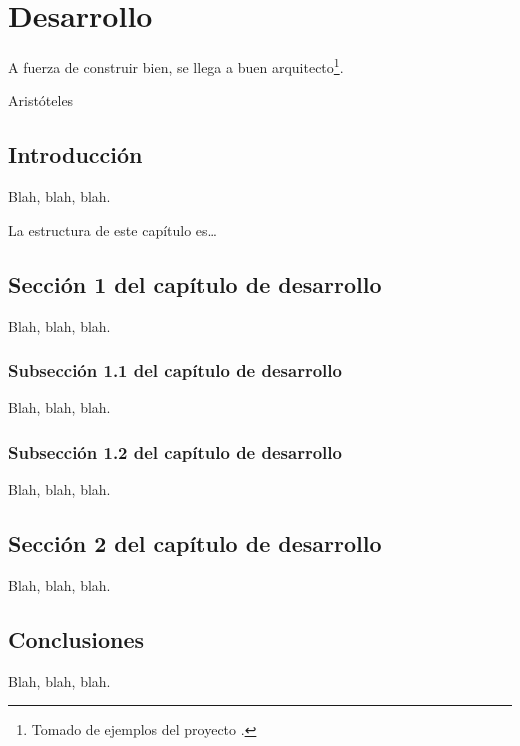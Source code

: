 %

\chapter{Desarrollo}
\label{cha:development}


\begin{FraseCelebre}
  \begin{Frase}
    A fuerza de construir bien, se llega a buen
    arquitecto\footnote{Tomado de ejemplos del proyecto \texis{}.}.
  \end{Frase}
  \begin{Fuente}
    Aristóteles
  \end{Fuente}
\end{FraseCelebre}



\section{Introducción}
\label{sec:development-introduction}

Blah, blah, blah.

La estructura de este capítulo es\ldots


\section{Sección 1 del capítulo de desarrollo}
\label{sec:development-1}

Blah, blah, blah.


\subsection{Subsección 1.1 del capítulo de desarrollo}
\label{sec:development-11}

Blah, blah, blah.


\subsection{Subsección 1.2 del capítulo de desarrollo}
\label{sec:development-12}

Blah, blah, blah.



\section{Sección 2 del capítulo de desarrollo}
\label{sec:development-2}

Blah, blah, blah.




\section{Conclusiones}
\label{sec:development-conclusions}

Blah, blah, blah.



